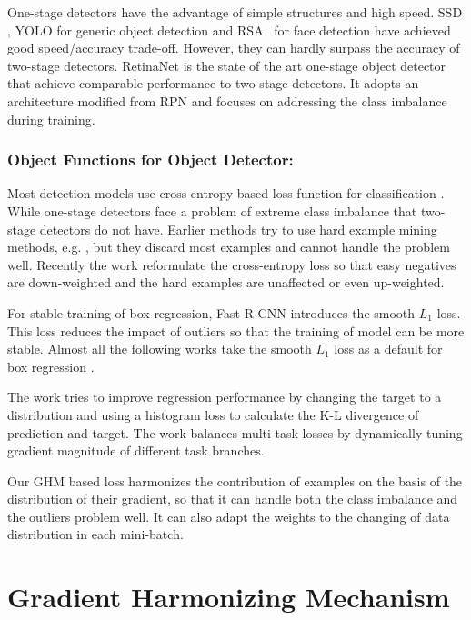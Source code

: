 \documentclass[letterpaper]{article} %
\begin{document}
 One-stage detectors have the advantage of simple structures and high speed. SSD \cite{ssd,dssd}, YOLO \cite{yolo,yolov2,yolov3} for generic object detection and RSA~\cite{songbeyond,liu2017recurrent} for face detection have achieved good speed/accuracy trade-off. However, they can hardly surpass the accuracy of two-stage detectors. RetinaNet \cite{focal} is the state of the art one-stage object detector that achieve comparable performance to two-stage detectors. It adopts an architecture modified from RPN \cite{faster} and focuses on addressing the class imbalance during training.

\subsubsection{Object Functions for Object Detector:}
Most detection models use cross entropy based loss function for classification \cite{fast,faster,ssd,rfcn,fpn,mask}. While one-stage detectors face a problem of extreme class imbalance that two-stage detectors do not have. Earlier methods try to use hard example mining methods, e.g. \cite{ohem,casdpm}, but they discard most examples and cannot handle the problem well. Recently the work \cite{focal} reformulate the cross-entropy loss so that easy negatives are down-weighted and the hard examples are unaffected or even up-weighted. 

For stable training of box regression, Fast R-CNN \cite{fast} introduces the smooth $L_1$ loss. This loss reduces the impact of outliers so that the training of model can be more stable. Almost all the following works take the smooth $L_1$ loss as a default for box regression \cite{faster,ssd,rfcn,fpn,mask}. 

The work \cite{dist} tries to improve regression performance by changing the target to a distribution and using a histogram loss to calculate the K-L divergence of prediction and target. The work \cite{grad} balances multi-task losses by dynamically tuning gradient magnitude of different task branches.

Our GHM based loss harmonizes the contribution of examples on the basis of the distribution of their gradient, so that it can handle both the class imbalance and the outliers problem well. It can also adapt the weights to the changing of data distribution in each mini-batch.


\section{Gradient Harmonizing Mechanism}
\label{sec:ghm}
\end{document}
